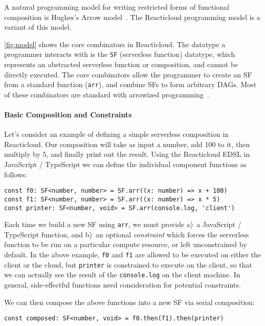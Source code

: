 \documentclass[10pt,sigplan,screen,nonacm]{acmart}
\begin{document}
A natural programming model for writing restricted forms of
functional composition is Hughes's 
Arrow model~\cite{hughes:arrows}. The Reacticloud programming
model is a variant of this model.

\cref{fig:model} shows the core combinators in Reacticloud.
The datatype a programmer interacts with is the \texttt{SF} (serverless function)
datatype, which represents an abstracted serverless function or composition,
and cannot be directly executed. The core combinators allow the programmer
to create an SF from a standard function (\texttt{arr}), and combine SFs
to form arbitrary DAGs. 
Most of these combinators are standard 
with arrowized programming~\cite{hughes:arrows}.

\paragraph{Basic Composition and Constraints}
Let's consider an example of defining a simple serverless composition
in Reacticloud. Our composition will take as input a number, add 100 to it,
then multiply by 5, and finally print out the result. Using the Reacticloud EDSL
in JavaScript / TypeScript we can define the individual component
functions as follows:

\begin{verbatim}
const f0: SF<number, number> = SF.arr((x: number) => x + 100)
const f1: SF<number, number> = SF.arr((x: number) => x * 5)
const printer: SF<number, void> = SF.arr(console.log, 'client')
\end{verbatim}

Each time we build a new SF using \texttt{arr}, we must provide
a)~a JavaScript / TypeScript function, and 
b)~an optional \emph{constraint} which forces the serverless function
to be run on a particular compute resource, or left unconstrained by default.
In the above example, \texttt{f0} and \texttt{f1} are allowed
to be executed on either the client or the cloud, 
but \texttt{printer} is constrained to
execute on the client, so that we can actually see the result of the
\texttt{console.log} on the client machine. 
In general, side-effectful functions need consideration for potential constraints.

We can then compose the above functions into a new SF via serial composition:

\begin{verbatim}
const composed: SF<number, void> = f0.then(f1).then(printer)
\end{verbatim}
\end{document}
